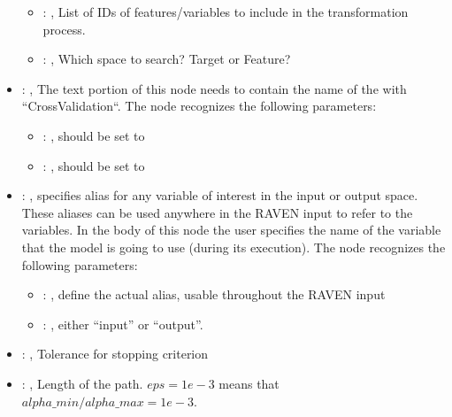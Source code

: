 \begin{itemize}
\begin{itemize}
        \item {}: , 
          List of IDs of features/variables to include in the transformation process.

        \item {}: , 
          Which space to search? Target or Feature?
      \end{itemize}

    \item {}: , 
      The text portion of this node needs to contain the name of the  with
               ``CrossValidation``.
      The  node recognizes the following parameters:
        \begin{itemize}
          \item {}: , 
            should be set to 
          \item {}: , 
            should be set to 
      \end{itemize}

    \item {}: , 
      specifies alias for         any variable of interest in the input or output space. These
      aliases can be used anywhere in the RAVEN input to         refer to the variables. In the body
      of this node the user specifies the name of the variable that the model is going to use
      (during its execution).
      The  node recognizes the following parameters:
        \begin{itemize}
          \item {}: , 
            define the actual alias, usable throughout the RAVEN input
          \item {}: , 
            either ``input'' or ``output''.
      \end{itemize}

    \item {}: , 
      Tolerance for stopping criterion

    \item {}: , 
      Length of the path. $eps=1e-3$ means that
      $alpha\_min / alpha\_max = 1e-3$.


\end{itemize}
